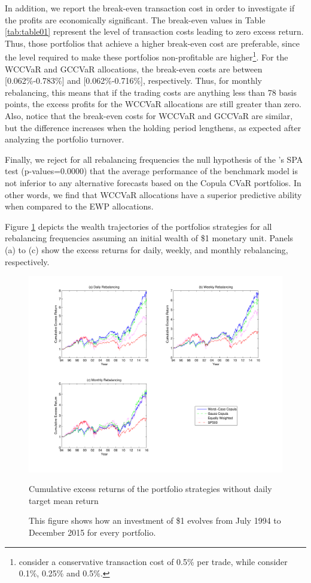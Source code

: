 \documentclass[a4paper,10pt]{article}
\begin{document}
In addition, we report the break-even transaction cost in order to investigate if the profits are economically significant. The break-even values in Table \ref{tab:table01} represent the level of transaction costs leading to zero excess return. Thus, those portfolios that achieve a higher break-even cost are preferable, since the level required to make these portfolios non-profitable are higher\footnote{\citet*{jega1993} consider a conservative transaction cost of 0.5\% per trade, while \citet*{allen1999} consider 0.1\%, 0.25\% and 0.5\%.}. For the WCCVaR and GCCVaR allocations, the break-even costs are between [0.062\%-0.783\%] and [0.062\%-0.716\%], respectively. Thus, for monthly rebalancing, this means that if the trading costs are anything less than 78 basis points, the excess profits for the WCCVaR allocations are still greater than zero. Also, notice that the break-even costs for WCCVaR and GCCVaR are similar, but the difference increases when the holding period lengthens, as expected after analyzing the portfolio turnover. 

Finally, we reject for all rebalancing frequencies the null hypothesis of the \citet*{hansen2005test}'s SPA test (p-values=0.0000) that the average performance of the benchmark model is not inferior to any alternative forecasts based on the Copula CVaR portfolios. In other words, we find that WCCVaR allocations have a superior predictive ability when compared to the EWP allocations.

Figure \ref{fig:fig01} depicts the wealth trajectories of the portfolios strategies for all rebalancing frequencies assuming an initial wealth of \$1 monetary unit. Panels (a) to (c) show the excess returns for daily, weekly, and monthly rebalancing, respectively. 

\begin{figure}[!ht]
	\hspace*{-2cm}
	\centering
	\includegraphics[scale=0.7]{fig1_nogrid.pdf}
	\caption{\scriptsize Cumulative excess returns of the portfolio strategies without daily target mean return }
	\caption*{This figure shows how an investment of \$1 evolves from July 1994 to December 2015 for every portfolio.}
	\label{fig:fig01}
\end{figure}
\end{document}
